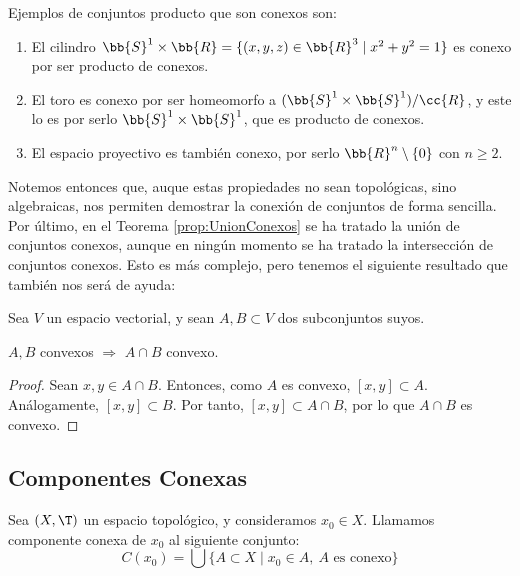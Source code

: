 \begin{ejemplo}
    Ejemplos de conjuntos producto que son conexos son:
    \begin{enumerate}
        \item El cilindro $\bb{S}^1\times \bb{R}=\{(x,y,z)\in \bb{R}^3\mid x^2 + y^2=1\}$ es conexo por ser producto de conexos.

        \item El toro es conexo por ser homeomorfo a $(\bb{S}^1\times \bb{S}^1)/\cc{R}$, y este lo es por serlo $\bb{S}^1\times \bb{S}^1$, que es producto de conexos.

        \item El espacio proyectivo es también conexo, por serlo $\bb{R}^n\setminus \{0\}$ con $n\geq 2$.
    \end{enumerate}
\end{ejemplo}
Notemos entonces que, auque estas propiedades no sean topológicas, sino algebraicas, nos permiten demostrar la conexión de conjuntos de forma sencilla.
Por último, en el Teorema \ref{prop:UnionConexos} se ha tratado la unión de conjuntos conexos, aunque en ningún momento se ha tratado la intersección de conjuntos conexos.
Esto es más complejo, pero tenemos el siguiente resultado que también nos será de ayuda:
\begin{prop}
    Sea $V$ un espacio vectorial, y sean $A,B\subset V$ dos subconjuntos suyos.
    \begin{center}
        $A,B$ convexos $\Longrightarrow$ $A\cap B$ convexo.
    \end{center}
\end{prop}
\begin{proof}
    Sean $x,y\in A\cap B$. Entonces, como $A$ es convexo, $[x,y]\subset A$. Análogamente, $[x,y]\subset B$. Por tanto, $[x,y]\subset A\cap B$, por lo que $A\cap B$ es convexo.
\end{proof}

\subsection{Componentes Conexas}
\begin{definicion}
    Sea $(X,\T)$ un espacio topológico, y consideramos $x_0\in X$. Llamamos componente conexa de $x_0$ al siguiente conjunto:
    \begin{equation*}
        C(x_0) = \bigcup\{A\subset X\mid x_0\in A,~A\text{ es conexo}\}
    \end{equation*}
\end{definicion}

